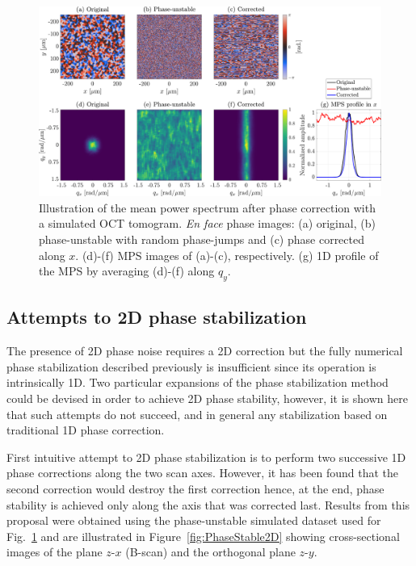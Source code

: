 \begin{figure}[htb!]
	\centering
	\includegraphics[width=\textwidth]{Figures/SHARP/PhaseStabilization/PhaseStabiliaztion1D-enface.pdf}
	\caption[Illustration of the mean power spectrum after phase correction with a simulated OCT tomogram.]{Illustration of the mean power spectrum after phase correction with a simulated OCT tomogram. \textit{En face} phase images: (a) original, (b) phase-unstable with random phase-jumps and (c) phase corrected along $x$. (d)-(f) MPS images of (a)-(c), respectively. (g) 1D profile of the MPS by averaging (d)-(f) along $q_y$.}
	\label{fig:PhaseStable1D-enface}
\end{figure}
\FloatBarrier

\subsection{Attempts to 2D phase stabilization}

The presence of 2D phase noise requires a 2D correction but the fully numerical phase stabilization described previously is insufficient since its operation is intrinsically 1D. Two particular expansions of the phase stabilization method could be devised in order to achieve 2D phase stability, however, it is shown here that such attempts do not succeed, and in general any stabilization based on traditional 1D phase correction.

First intuitive attempt to 2D phase stabilization is to perform two successive 1D phase corrections along the two scan axes. However, it has been found that the second correction would destroy the first correction hence, at the end, phase stability is achieved only along the axis that was corrected last. Results from this proposal were obtained using the phase-unstable simulated dataset used for Fig.~\ref{fig:PhaseStable1D-enface} and are illustrated in Figure~\ref{fig:PhaseStable2D} showing cross-sectional images of the plane $z$-$x$ (B-scan) and the orthogonal plane $z$-$y$.

